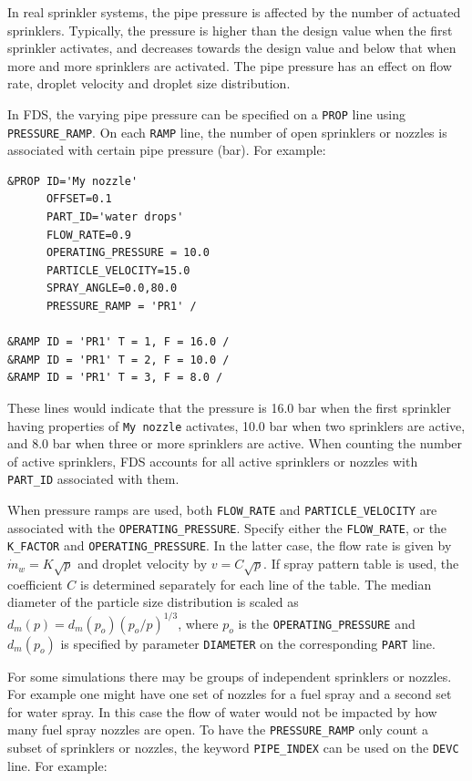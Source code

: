 \documentclass[11pt]{book}
\newcommand{\ct}{\tt\small}
\newcommand{\dm}{\dot{m}}
\begin{document}
In real sprinkler systems, the pipe pressure is affected by the number of actuated sprinklers. Typically,
the pressure is higher than the design value when the first sprinkler activates, and decreases towards the design
value and below that when more and more sprinklers are activated. The pipe pressure has an effect on flow rate,
droplet velocity and droplet size distribution.

In FDS, the varying pipe pressure can be specified on a {\ct PROP} line using {\ct PRESSURE\_RAMP}. On each {\ct RAMP} line,
the number of open sprinklers or nozzles is associated with certain pipe pressure (bar). For example:

\footnotesize
\begin{verbatim}
&PROP ID='My nozzle'
      OFFSET=0.1
      PART_ID='water drops'
      FLOW_RATE=0.9
      OPERATING_PRESSURE = 10.0
      PARTICLE_VELOCITY=15.0
      SPRAY_ANGLE=0.0,80.0
      PRESSURE_RAMP = 'PR1' /

&RAMP ID = 'PR1' T = 1, F = 16.0 /
&RAMP ID = 'PR1' T = 2, F = 10.0 /
&RAMP ID = 'PR1' T = 3, F = 8.0 /
\end{verbatim}
\normalsize
\noindent
These lines would indicate that the pressure is 16.0 bar when the first sprinkler having properties of {\ct My nozzle}
activates, 10.0 bar when two sprinklers are active, and 8.0 bar when three or more sprinklers are active. When counting the
number of active sprinklers, FDS accounts for all active sprinklers or nozzles with {\ct PART\_ID} associated with them.

When pressure ramps are used, both {\ct FLOW\_RATE} and {\ct PARTICLE\_VELOCITY} are associated with the
{\ct OPERATING\_PRESSURE}. Specify either the {\ct FLOW\_RATE}, or the
{\ct K\_FACTOR} and {\ct OPERATING\_PRESSURE}. In the latter case, the flow rate is given by $ \dm_w = K \sqrt{p}$ and droplet velocity
by $v = C \sqrt{p}$.  If spray pattern table is used, the coefficient $C$ is determined separately for each line of the
table. The median diameter of the particle size distribution is scaled as
$d_m(p) = d_m(p_o)(p_o/p)^{1/3}$, where $p_o$ is the {\ct OPERATING\_PRESSURE}
and $d_m(p_o)$ is specified by parameter {\ct DIAMETER} on the corresponding {\ct PART} line.

For some simulations there may be groups of independent sprinklers or nozzles.  For example one might have one set of nozzles for a fuel spray and a second set for water spray.  In this case the flow of water would not be impacted by how many fuel spray nozzles are open.  To have the {\ct PRESSURE\_RAMP} only count a subset of sprinklers or nozzles, the keyword {\ct PIPE\_INDEX} can be used on the {\ct DEVC} line. For example:
\end{document}
